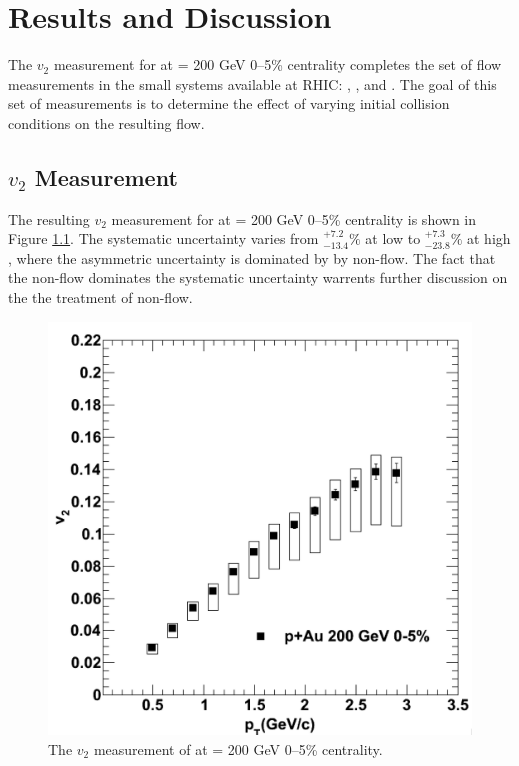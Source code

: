 \chapter{Results and Discussion}
The $v_2$ measurement for \pau at \sqsn = 200 GeV 0--5\% centrality completes the set of flow measurements in the small systems available at RHIC: \pau, \dau, and \hau. The goal of this set of measurements is to determine the effect of varying initial collision conditions on the resulting flow.
\section{$v_2$ Measurement}
The resulting $v_2$ measurement for \pau at \sqsn = 200 GeV 0--5\% centrality is shown in Figure \ref{fig:pau_points_alone}. The systematic uncertainty varies from $^{+7.2}_{-13.4}\%$ at low \pt to $^{+7.3}_{-23.8}\%$ at high \pt, where the asymmetric uncertainty is dominated by by non-flow. The fact that the non-flow dominates the systematic uncertainty warrents further discussion on the the treatment of non-flow.

\begin{figure}[!ht]
\begin{center}
\includegraphics[width=0.65\linewidth]{figs/pau_points.png}
\caption{The $v_2$ measurement of \pau at \sqsn =  200 GeV 0--5\% centrality.}
\label{fig:pau_points_alone}
\end{center}
\end{figure}

